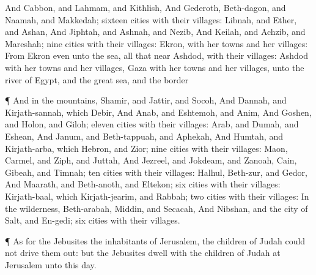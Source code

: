 {And
Cabbon, and
Lahmam, and
Kithlish,
And
Gederoth,
Beth-dagon, and
Naamah, and
Makkedah;
sixteen
cities with their
villages:
Libnah, and
Ether, and
Ashan,
And
Jiphtah, and
Ashnah, and
Nezib,
And
Keilah, and
Achzib, and
Mareshah;
nine
cities with their
villages:
Ekron, with her
towns and her
villages:
From
Ekron even unto the
sea, all that
{}
near
Ashdod, with their
villages:
Ashdod with her
towns and her
villages,
Gaza with her
towns and her
villages, unto the
river of
Egypt, and the
great
sea, and the
border
{}
\par }{\PP {}¶ And in the
mountains,
Shamir, and
Jattir, and
Socoh,
And
Dannah, and
Kirjath-sannah, which
{}
Debir,
And
Anab, and
Eshtemoh, and
Anim,
And
Goshen, and
Holon, and
Giloh;
eleven
cities with their
villages:
Arab, and
Dumah, and
Eshean,
And
Janum, and
Beth-tappuah, and
Aphekah,
And
Humtah, and
Kirjath-arba, which
{}
Hebron, and
Zior;
nine
cities with their
villages:
Maon,
Carmel, and
Ziph, and
Juttah,
And
Jezreel, and
Jokdeam, and
Zanoah,
Cain,
Gibeah, and
Timnah;
ten
cities with their
villages:
Halhul,
Beth-zur, and
Gedor,
And
Maarath, and
Beth-anoth, and
Eltekon;
six
cities with their
villages:
Kirjath-baal, which
{}
Kirjath-jearim, and
Rabbah;
two
cities with their
villages:
In the
wilderness,
Beth-arabah,
Middin, and
Secacah,
And
Nibshan, and the city of
Salt, and
En-gedi;
six
cities with their
villages.
\par }{\PP {}¶ As for the
Jebusites the
inhabitants of
Jerusalem, the
children of
Judah
could not drive them
out: but the
Jebusites
dwell with the
children of
Judah at
Jerusalem unto this
day.

}
